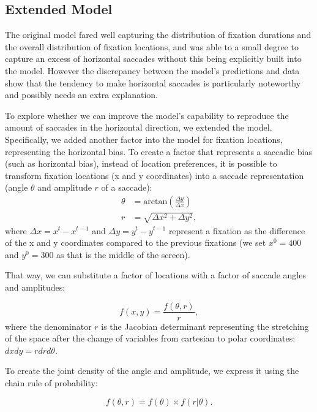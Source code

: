 \documentclass{article}
\begin{document}
\subsection{Extended Model}

The original model fared well capturing the distribution of fixation durations and the overall distribution of fixation locations, and was able to a small degree to capture an excess of horizontal saccades without this being explicitly built into the model. However the discrepancy between the model's predictions and data show that the tendency to make horizontal saccades is particularly noteworthy and possibly needs an extra explanation.

To explore whether we can improve the model's capability to reproduce the amount of saccades in the horizontal direction, we extended the model. Specifically, we added another factor into the model for fixation locations, representing the horizontal bias. To create a factor that represents a saccadic bias (such as horizontal bias), instead of location preferences, it is possible to transform fixation locations (x and y coordinates) into a saccade representation (angle $\theta$ and amplitude $r$ of a saccade):
\begin{equation}
    \begin{aligned}
      \theta & = \text{arctan}\left(\frac{\Delta y}{\Delta x}\right) \\
      r & = \sqrt{\Delta x^2 + \Delta y^2},
    \end{aligned}
\end{equation}
where $\Delta x = x^t - x^{t-1}$ and $\Delta y = y^t - y^{t-1}$ represent a fixation as the difference of the x and y coordinates compared to the previous fixations (we set $x^0 = 400$ and $y^0 = 300$ as that is the middle of the screen).

That way, we can substitute a factor of locations with a factor of saccade angles and amplitudes:

\begin{equation}
    f(x, y) = \frac{f(\theta, r)}{r},
\end{equation}
where the denominator $r$ is the Jacobian determinant representing the stretching of the space after the change of variables from cartesian to polar coordinates: $dx dy = r dr d\theta$. 

To create the joint density of the angle and amplitude, we express it using the chain rule of probability:

\begin{equation}
    f(\theta, r) = f(\theta) \times f(r | \theta).
\end{equation}
\end{document}

